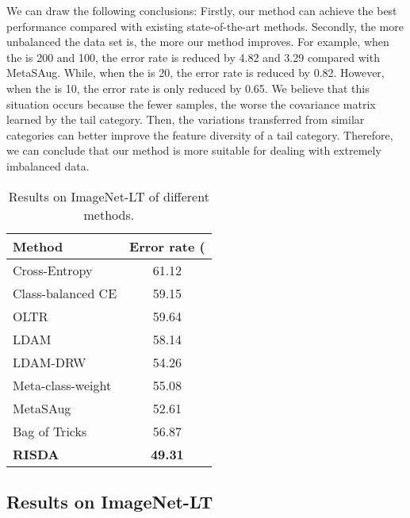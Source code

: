 \documentclass[letterpaper]{article} \usepackage{aaai22}  \usepackage{times}  \usepackage{helvet}  \usepackage{courier}  \usepackage[hyphens]{url}  \usepackage{graphicx} \usepackage{bm}
\begin{document}
	


	


	We can draw the following conclusions: Firstly, our method can achieve the best performance compared with existing state-of-the-art methods. Secondly, the more unbalanced the data set is, the more our method improves. For example, when the  is 200 and 100, the error rate is reduced by 4.82 and 3.29  compared with MetaSAug. While, when the  is 20, the error rate is reduced by 0.82. However, when the  is 10, the error rate is only reduced by 0.65. 
	We believe that this situation occurs because the fewer samples, the worse the covariance matrix learned by the tail category. Then, the variations transferred from similar categories can better improve the feature diversity of a tail category. Therefore, we can conclude that our method is more suitable for dealing with extremely imbalanced data.
	
	\begin{table}[t]
\centering
		\begin{tabular}{l c}
			\toprule
			Method      & Error rate (     \\ 
			\midrule
			Cross-Entropy & 61.12                \\ 
			Class-balanced CE \cite{cui2019class}&59.15                      \\ 
			OLTR \cite{liu2019large}& 59.64                     \\ 
			LDAM \cite{cao2019learning}&58.14                      \\ 
			LDAM-DRW \cite{cao2019learning}&54.26                      \\ 
			Meta-class-weight \cite{jamal2020rethinking}&55.08                      \\ 
			MetaSAug \cite{li2021metasaug} &52.61                      \\ 
			Bag of Tricks \cite{zhang2021bag} &56.87                      \\ 
			\textbf{RISDA}&\textbf{49.31}                    \\ 
			\bottomrule
		\end{tabular}
		\caption{Results on ImageNet-LT of different methods. }
\label{tab2}
	\end{table}


	
\subsection{Results on ImageNet-LT }
	
\end{document}
